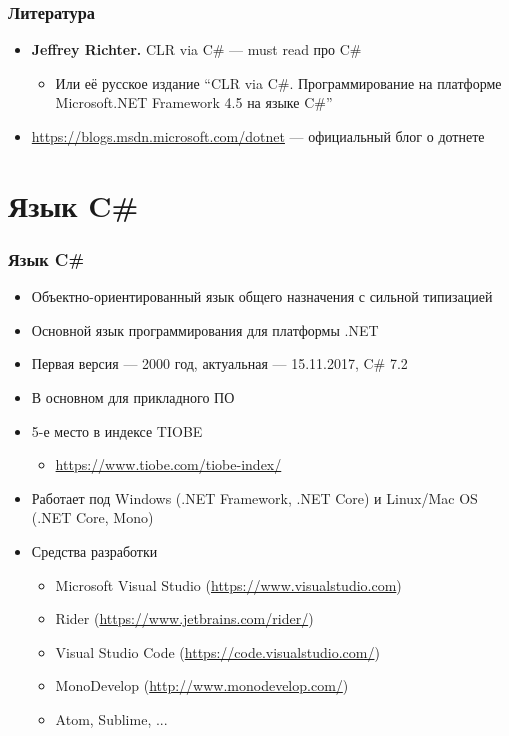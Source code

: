 \documentclass[xetex,mathserif,serif]{beamer}
\begin{document}
	\begin{frame}
	\frametitle{Литература}
		\begin{itemize}
			\item \textbf{Jeffrey Richter.} CLR via C\# --- must read про C\#
			\begin{itemize}
				\item Или её русское издание ``CLR via C\#. Программирование на платформе Microsoft.NET Framework 4.5 на языке C\#''
			\end{itemize}
			\item \url{https://blogs.msdn.microsoft.com/dotnet} --- официальный блог о дотнете
		\end{itemize}
	\end{frame}

	\section{Язык C\#}

	\begin{frame}
		\frametitle{Язык C\#}
		\begin{itemize}
			\item Объектно-ориентированный язык общего назначения с сильной типизацией
			\item Основной язык программирования для платформы .NET
			\item Первая версия --- 2000 год, актуальная --- 15.11.2017, C\# 7.2
			\item В основном для прикладного ПО
			\item 5-е место в индексе TIOBE
			\begin{itemize}
				\item \url{https://www.tiobe.com/tiobe-index/}
			\end{itemize}
			\item Работает под Windows (.NET Framework, .NET Core) и Linux/Mac OS (.NET Core, Mono)
			\item Средства разработки
			\begin{itemize}
				\item Microsoft Visual Studio (\url{https://www.visualstudio.com})
				\item Rider (\url{https://www.jetbrains.com/rider/})
				\item Visual Studio Code (\url{https://code.visualstudio.com/})
				\item MonoDevelop (\url{http://www.monodevelop.com/})
				\item Atom, Sublime, ...
			\end{itemize}
		\end{itemize}
	\end{frame}
\end{document}
